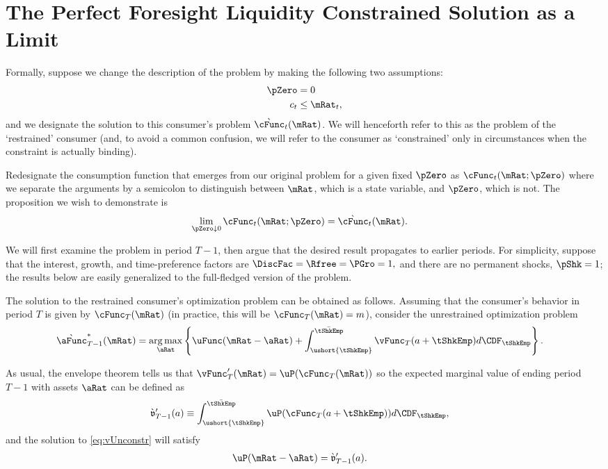 \documentclass[\econtexRoot/BufferStockTeory.tex]{subfiles}
\begin{document}
\section{The Perfect Foresight Liquidity Constrained Solution as a Limit}
\label{sec:LiqConstrAsLimit}

Formally, suppose we change the description of the problem by making
the following two assumptions:
\begin{eqnarray*}
    \pZero   & = 0
\\  c_{t} & \leq  \mRat_{t} \label{eq:liqconstr},
\end{eqnarray*}
and we designate the solution to this consumer's problem
$\grave{\cFunc}_{t}(\mRat)$.  We will henceforth refer to this as the
problem of the `restrained' consumer (and, to avoid a common
confusion, we will refer to the consumer as `constrained' only in
circumstances when the constraint is actually binding).

Redesignate the consumption function that emerges from our original
problem for a given fixed $\pZero$ as $\cFunc_{t}(\mRat;\pZero)$ where we
separate the arguments by a semicolon to distinguish between $\mRat$,
which is a state variable, and $\pZero$, which is not.  The
proposition we wish to demonstrate is
\begin{align}
  \lim_{\pZero \downarrow 0} \cFunc_{t}(\mRat;\pZero)  & = \grave{\cFunc}_{t}(\mRat). \label{eq:RestrEqUnrestr} 
\end{align}

We will first examine the problem in period $T-1$, then
argue that the desired result propagates to earlier periods.
For simplicity, suppose that the interest, growth, and time-preference
factors are $\DiscFac = \Rfree = \PGro = 1,$ and there are no permanent
shocks, $\pShk=1$; the results below are easily generalized
to the full-fledged version of the problem.

The solution to the restrained consumer's optimization problem can be
obtained as follows.  Assuming that the consumer's behavior in period
$T$ is given by $\cFunc_{T}(\mRat)$ (in practice, this will be
$\cFunc_{T}(\mRat)=m$), consider the unrestrained optimization problem
\begin{align}
  \grave{\aFunc}^{*}_{T-1}(\mRat)  & = \underset{\aRat}{\arg \max} \left\{\uFunc(\mRat-\aRat) +  \int_{\ushort{\tShkEmp}}^{\bar{\tShkEmp}} \vFunc_{T}(a+\tShkEmp) d\CDF_{\tShkEmp} \right\}. \label{eq:vUnconstr}
\end{align}

As usual, the envelope theorem tells us that
$\vFunc_{T}^{\prime}(\mRat)=\uP(\cFunc_{T}(\mRat))$ so the expected marginal
value of ending period $T-1$ with assets $\aRat$ can be defined as
\begin{align}
  \grave{\mathfrak{v}}_{T-1}^{\prime}(a)  & \equiv  \int_{\ushort{\tShkEmp}}^{\bar{\tShkEmp}} \uP(\cFunc_{T}(a+\tShkEmp)) d\CDF_{\tShkEmp}, \notag
\end{align}
and the solution to \eqref{eq:vUnconstr} will satisfy
\begin{align}
  \uP(\mRat-\aRat)  & =  \grave{\mathfrak{v}}_{T-1}^{\prime}(a) \label{eq:uPConstr}.
%
\end{align}
\end{document}
